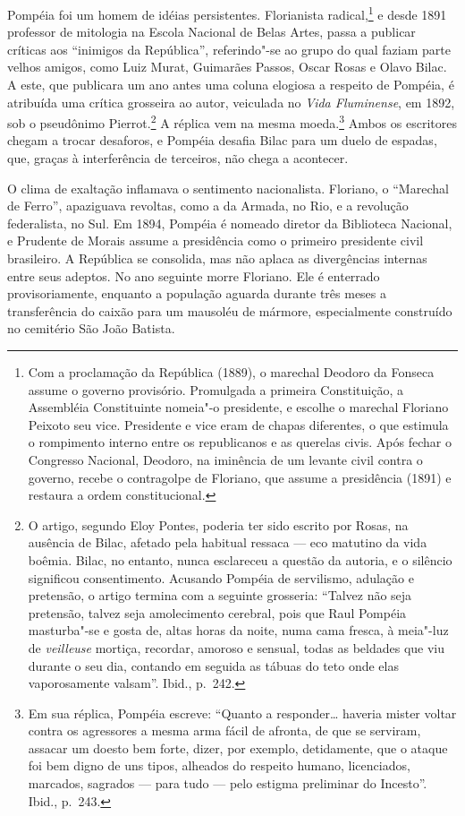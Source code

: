 Pompéia foi um homem de idéias persistentes. Florianista
radical,\footnote{Com a proclamação da República (1889), o marechal
Deodoro da Fonseca assume o governo provisório. Promulgada a primeira
Constituição, a Assembléia Constituinte nomeia"-o presidente, e
escolhe o marechal Floriano Peixoto seu vice. Presidente e vice eram de
chapas diferentes, o que estimula o rompimento interno entre os
republicanos e as querelas civis. Após fechar o Congresso Nacional,
Deodoro, na iminência de um levante civil contra o governo, recebe o
contragolpe de Floriano, que assume a presidência (1891) e restaura a
ordem constitucional.} e desde 1891 professor de
mitologia na Escola Nacional de Belas Artes, passa a publicar críticas
aos ``inimigos da República'', referindo"-se ao grupo do qual faziam
parte velhos amigos, como Luiz Murat, Guimarães Passos, Oscar Rosas e
Olavo Bilac. A este, que publicara um ano antes uma coluna elogiosa a
respeito de Pompéia, é atribuída uma crítica grosseira ao autor,
veiculada no \textit{Vida Fluminense}, em
1892, sob o pseudônimo Pierrot.\footnote{O artigo,
segundo Eloy Pontes, poderia ter sido escrito por Rosas, na ausência de
Bilac, afetado pela habitual ressaca --- eco matutino da vida boêmia.
Bilac, no entanto, nunca esclareceu a questão da autoria, e o silêncio
significou consentimento. Acusando Pompéia de servilismo, adulação e
pretensão, o artigo termina com a seguinte grosseria: ``Talvez não seja
pretensão, talvez seja amolecimento cerebral, pois que Raul Pompéia
masturba"-se e gosta de, altas horas da noite, numa cama fresca, à
meia"-luz de \textit{veilleuse} mortiça,
recordar, amoroso e sensual, todas as beldades que viu durante o seu
dia, contando em seguida as tábuas do teto onde elas vaporosamente
valsam''. Ibid., p.~242.} A réplica vem na mesma
moeda.\footnote{ Em sua réplica, Pompéia escreve:
``Quanto a responder\ldots{} haveria mister voltar contra os agressores a
mesma arma fácil de afronta, de que se serviram, assacar um doesto bem
forte, dizer, por exemplo, detidamente, que o ataque foi bem digno de 
uns tipos, alheados do respeito humano, licenciados, marcados, sagrados 
--- para tudo --- pelo estigma preliminar do Incesto''. Ibid., p.~243.} 
Ambos os escritores chegam a trocar desaforos, e
Pompéia desafia Bilac para um duelo de espadas, que, graças à
interferência de terceiros, não chega a acontecer. 

O clima de exaltação inflamava o sentimento nacionalista. Floriano, o
``Marechal de Ferro'', apaziguava revoltas, como a da Armada, no Rio, e a
revolução federalista, no Sul. Em 1894, Pompéia é nomeado diretor da
Biblioteca Nacional, e Prudente de Morais assume a presidência como o
primeiro presidente civil brasileiro. A República se consolida, mas não
aplaca as divergências internas entre seus adeptos. No ano seguinte
morre Floriano. Ele é enterrado provisoriamente, enquanto a população
aguarda durante três meses a transferência do caixão para um mausoléu
de mármore, especialmente construído no cemitério São João Batista.

